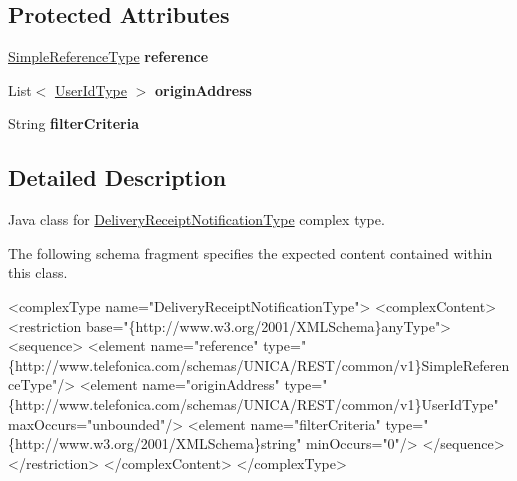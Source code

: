 \subsection*{Protected Attributes}
\begin{DoxyCompactItemize}
\item 
\hypertarget{classcom_1_1telefonica_1_1schemas_1_1unica_1_1rest_1_1mms_1_1v1_1_1DeliveryReceiptNotificationType_a1a8197729924ee8cfcd034df7414aabe}{
\hyperlink{classcom_1_1telefonica_1_1schemas_1_1unica_1_1rest_1_1common_1_1v1_1_1SimpleReferenceType}{SimpleReferenceType} {\bfseries reference}}
\label{classcom_1_1telefonica_1_1schemas_1_1unica_1_1rest_1_1mms_1_1v1_1_1DeliveryReceiptNotificationType_a1a8197729924ee8cfcd034df7414aabe}

\item 
\hypertarget{classcom_1_1telefonica_1_1schemas_1_1unica_1_1rest_1_1mms_1_1v1_1_1DeliveryReceiptNotificationType_a030a91f966784767bd2b7175ada16a8a}{
List$<$ \hyperlink{classcom_1_1telefonica_1_1schemas_1_1unica_1_1rest_1_1common_1_1v1_1_1UserIdType}{UserIdType} $>$ {\bfseries originAddress}}
\label{classcom_1_1telefonica_1_1schemas_1_1unica_1_1rest_1_1mms_1_1v1_1_1DeliveryReceiptNotificationType_a030a91f966784767bd2b7175ada16a8a}

\item 
\hypertarget{classcom_1_1telefonica_1_1schemas_1_1unica_1_1rest_1_1mms_1_1v1_1_1DeliveryReceiptNotificationType_a8ab661511f7976226e9808fe499e6599}{
String {\bfseries filterCriteria}}
\label{classcom_1_1telefonica_1_1schemas_1_1unica_1_1rest_1_1mms_1_1v1_1_1DeliveryReceiptNotificationType_a8ab661511f7976226e9808fe499e6599}

\end{DoxyCompactItemize}


\subsection{Detailed Description}
Java class for \hyperlink{classcom_1_1telefonica_1_1schemas_1_1unica_1_1rest_1_1mms_1_1v1_1_1DeliveryReceiptNotificationType}{DeliveryReceiptNotificationType} complex type.

The following schema fragment specifies the expected content contained within this class.


\begin{DoxyPre}
 <complexType name="DeliveryReceiptNotificationType">
   <complexContent>
     <restriction base="\{http://www.w3.org/2001/XMLSchema\}anyType">
       <sequence>
         <element name="reference" type="\{http://www.telefonica.com/schemas/UNICA/REST/common/v1\}SimpleReferenceType"/>
         <element name="originAddress" type="\{http://www.telefonica.com/schemas/UNICA/REST/common/v1\}UserIdType" maxOccurs="unbounded"/>
         <element name="filterCriteria" type="\{http://www.w3.org/2001/XMLSchema\}string" minOccurs="0"/>
       </sequence>
     </restriction>
   </complexContent>
 </complexType>
 \end{DoxyPre}
 

